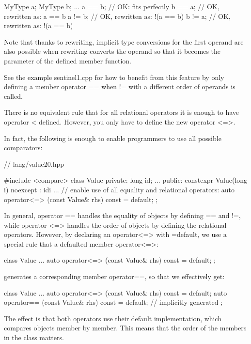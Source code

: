 \begin{cpp}
MyType a;
MyType b;
...
a == b; // OK: fits perfectly
b == a; // OK, rewritten as: a == b
a != b; // OK, rewritten as: !(a == b)
b != a; // OK, rewritten as: !(a == b)
\end{cpp}

Note that thanks to rewriting, implicit type conversions for the first operand are also possible when rewriting converts the operand so that it becomes the parameter of the defined member function.

See the example sentinel1.cpp for how to benefit from this feature by only defining a member operator == when != with a different order of operands is called.


There is no equivalent rule that for all relational operators it is enough to have operator < defined. However, you only have to define the new operator <=>.

In fact, the following is enough to enable programmers to use all possible comparators:

\begin{cpp}
// lang/value20.hpp

#include <compare>
class Value {
private:
	long id;
	...
public:
	constexpr Value(long i) noexcept
	: id{i} {
	}
	...
	// enable use of all equality and relational operators:
	auto operator<=> (const Value& rhs) const = default;
};
\end{cpp}

In general, operator == handles the equality of objects by defining == and !=, while operator <=> handles the order of objects by defining the relational operators. However, by declaring an operator<=> with =default, we use a special rule that a defaulted member operator<=>:

\begin{cpp}
class Value {
	...
	auto operator<=> (const Value& rhs) const = default;
};
\end{cpp}

generates a corresponding member operator==, so that we effectively get:

\begin{cpp}
class Value {
	...
	auto operator<=> (const Value& rhs) const = default;
	auto operator== (const Value& rhs) const = default; // implicitly generated
};
\end{cpp}

The effect is that both operators use their default implementation, which compares objects member by member. This means that the order of the members in the class matters.

